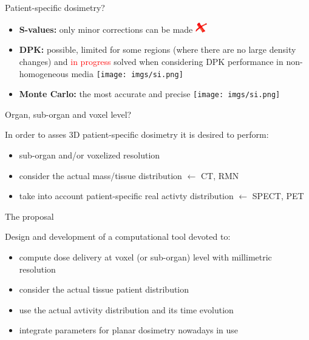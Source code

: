 \documentclass[ignorenonframetext,]{beamer}
\begin{document}
\begin{frame}{Patient-specific dosimetry?}
\protect\hypertarget{patient-specific-dosimetry-3}{}

\begin{itemize}
\item
  \textbf{S-values:} only minor corrections can be made \hspace{.2cm}
  \includegraphics[width=5mm,height=\textheight]{imgs/no.png}
\item
  \textbf{DPK:} possible, limited for some regions (where there are no
  large density changes) and \textcolor{red}{in progress} solved when
  considering DPK performance in non-homogeneous media \hspace{.2cm}
  \texttt{[image: imgs/si.png]}
\item
  \textbf{Monte Carlo:} the most accurate and precise \hspace{.2cm}
  \texttt{[image: imgs/si.png]}
\end{itemize}

\end{frame}

\begin{frame}{Organ, sub-organ and voxel level?}
\protect\hypertarget{organ-sub-organ-and-voxel-level}{}

In order to asses 3D patient-specific dosimetry it is desired to
perform:

\begin{itemize}
\item
  sub-organ and/or voxelized resolution
\item
  consider the actual mass/tissue distribution \(\leftarrow\) CT, RMN
\item
  take into account patient-specific real activty distribution
  \(\leftarrow\) SPECT, PET
\end{itemize}

\end{frame}

\begin{frame}{The proposal}
\protect\hypertarget{the-proposal}{}

Design and development of a computational tool devoted to:

\begin{itemize}
\item
  compute dose delivery at voxel (or sub-organ) level with millimetric
  resolution
\item
  consider the actual tissue patient distribution
\item
  use the actual avtivity distribution and its time evolution
\item
  integrate parameters for planar dosimetry nowadays in use
\end{itemize}

\end{frame}
\end{document}
